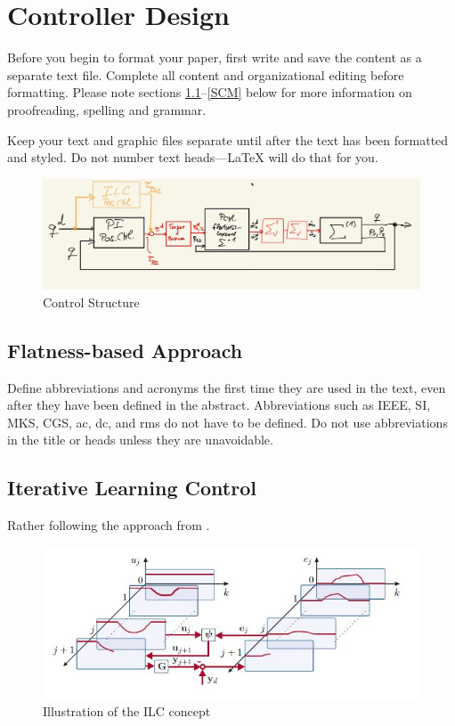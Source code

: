 \documentclass[conference]{IEEEtran}
\begin{document}
\section{Controller Design}
Before you begin to format your paper, first write and save the content as a 
separate text file. Complete all content and organizational editing before 
formatting. Please note sections \ref{AA}--\ref{SCM} below for more information on 
proofreading, spelling and grammar.

Keep your text and graphic files separate until after the text has been 
formatted and styled. Do not number text heads---{\LaTeX} will do that 
for you.

\begin{figure}[tbp]
\centerline{\includegraphics[scale=0.5]{./pictures/CtrlStructure_ILC.jpg}}
\caption{Control Structure}
\label{fig:CtrlStrct}
\end{figure}

\subsection{Flatness-based Approach}\label{AA}
Define abbreviations and acronyms the first time they are used in the text, 
even after they have been defined in the abstract. Abbreviations such as 
IEEE, SI, MKS, CGS, ac, dc, and rms do not have to be defined. Do not use 
abbreviations in the title or heads unless they are unavoidable.

\subsection{Iterative Learning Control}
Rather following the approach from \cite{ILCGlueck2015}.

\begin{figure}[tbp]
\centerline{\includegraphics{./pictures/ILCillu.jpg}}
\caption{Illustration of the ILC concept \cite{ILCGlueck2015}}
\label{fig:illuILC}
\end{figure}
\end{document}
